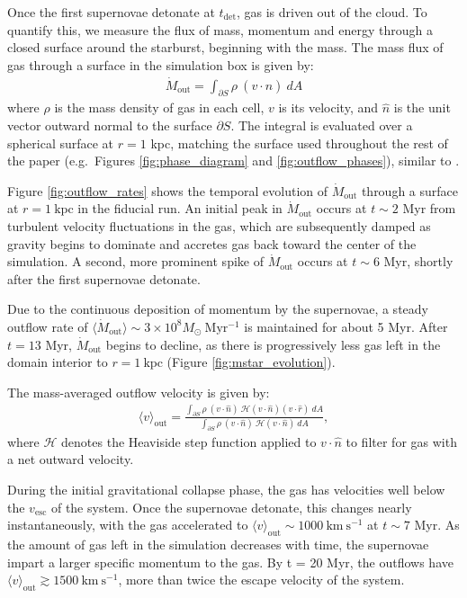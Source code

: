 \documentclass[twocolumn,linenumbers]{aastex631}
\begin{document}
Once the first supernovae detonate at $t_\mathrm{det}$, gas is driven out of the cloud. To quantify this, we measure the flux of mass, momentum and energy through a closed surface around the starburst, beginning with the mass. The mass flux of gas through a surface in the simulation box is given by: 
\begin{align}
    \dot{M}_\mathrm{out} = \int_{\partial S} \rho \ (v \cdot \hat{n})\ dA
\end{align}
where $\rho$ is the mass density of gas in each cell, $v$ is its velocity, and $\hat{n}$ is the unit vector outward normal to the surface $\partial S$. The integral is evaluated over a spherical surface at $r = 1$ kpc, matching the surface used throughout the rest of the paper (e.g.\ Figures \ref{fig:phase_diagram} and \ref{fig:outflow_phases}), similar to \cite{2023MNRAS.521.5160M}. 

Figure \ref{fig:outflow_rates} shows the temporal evolution of $\dot{M}_\mathrm{out}$ through a surface at $r = 1\ \mathrm{kpc}$ in the fiducial run. An initial peak in $\dot{M}_\mathrm{out}$ occurs at $t \sim 2$ Myr from turbulent velocity fluctuations in the gas, which are subsequently damped as gravity begins to dominate and accretes gas back toward the center of the simulation. A second, more prominent spike of $\dot{M}_\mathrm{out}$ occurs at $t \sim 6$ Myr, shortly after the first supernovae detonate.

Due to the continuous deposition of momentum by the supernovae, a steady outflow rate of $\langle \dot{M}_\mathrm{out} \rangle \sim 3\times 10^8 M_\odot \ \mathrm{Myr^{-1}}$ is maintained for about 5 Myr. After $t = 13$ Myr, $\dot{M}_\mathrm{out}$ begins to decline, as there is progressively less gas left in the domain interior to $r = 1\ \mathrm{kpc}$ (Figure \ref{fig:mstar_evolution}). 

The mass-averaged outflow velocity is given by:
\begin{align}
\langle v \rangle _\mathrm{out} = \frac{\int_{\partial S} \rho \ (v \cdot \hat{n})\ \mathcal{H}(v\cdot \hat{n})(v\cdot \hat{r})\ dA}{\int_{\partial S} \rho \ (v \cdot \hat{n})\ \mathcal{H}(v\cdot \hat{n})\ dA},
\end{align}
where $\mathcal{H}$ denotes the Heaviside step function applied to $v \cdot \hat{n}$ to filter for gas with a net outward velocity. 

During the initial gravitational collapse phase, the gas has velocities well below the $v_\mathrm{esc}$ of the system. Once the supernovae detonate, this changes nearly instantaneously, with the gas accelerated to $\langle v \rangle _\mathrm{out} \sim 1000\ \mathrm{km\ s^{-1}}$ at $t \sim 7$ Myr. As the amount of gas left in the simulation decreases with time, the supernovae impart a larger specific momentum to the gas. By t = 20 Myr, the outflows have $\langle v \rangle _\mathrm{out} \gtrsim 1500\ \mathrm{km\ s^{-1}}$, more than twice the escape velocity of the system.
\end{document}
